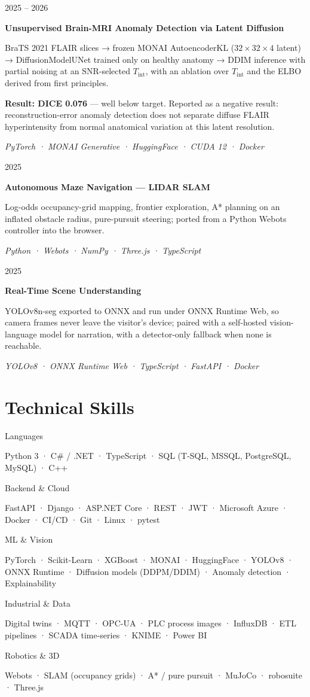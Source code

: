 \documentclass[10pt,a4paper]{article}
\newlength{\cvleft}\setlength{\cvleft}{30mm}
\newlength{\cvgap}\setlength{\cvgap}{5mm}
\newcommand{\cvrow}[2]{%
  \noindent\begin{minipage}[t]{\cvleft}\raggedright\strut #1\end{minipage}%
  \hspace{\cvgap}%
  \begin{minipage}[t]{\dimexpr\textwidth-\cvleft-\cvgap\relax}\strut #2\end{minipage}%
  \par\vspace{4.5pt}}
\newcommand{\dates}[1]{\sansfont\fontsize{9}{11}\selectfont\color{mid}#1}
\newcommand{\role}[1]{\textbf{#1}}
\newcommand{\stack}[1]{{\fontsize{9}{11}\selectfont\color{mid}\textit{#1}}}
\begin{document}
\cvrow{\dates{2025 – 2026}}{%
\role{Unsupervised Brain-MRI Anomaly Detection via Latent Diffusion}\\
\begin{pts}
\item BraTS 2021 FLAIR slices → frozen MONAI AutoencoderKL ($32\times32\times4$ latent) → DiffusionModelUNet trained only on healthy anatomy → DDIM inference with partial noising at an SNR-selected $T_{\mathrm{int}}$, with an ablation over $T_{\mathrm{int}}$ and the ELBO derived from first principles.
\item \textbf{Result: DICE 0.076} — well below target. Reported as a negative result: reconstruction-error anomaly detection does not separate diffuse FLAIR hyperintensity from normal anatomical variation at this latent resolution.
\end{pts}
\stack{PyTorch · MONAI Generative · HuggingFace · CUDA 12 · Docker}}


\cvrow{\dates{2025}}{%
\role{Autonomous Maze Navigation — LIDAR SLAM}\\
\begin{pts}
\item Log-odds occupancy-grid mapping, frontier exploration, A* planning on an inflated obstacle radius, pure-pursuit steering; ported from a Python Webots controller into the browser.
\end{pts}
\stack{Python · Webots · NumPy · Three.js · TypeScript}}


\cvrow{\dates{2025}}{%
\role{Real-Time Scene Understanding}\\
\begin{pts}
\item YOLOv8n-seg exported to ONNX and run under ONNX Runtime Web, so camera frames never leave the visitor's device; paired with a self-hosted vision-language model for narration, with a detector-only fallback when none is reachable.
\end{pts}
\stack{YOLOv8 · ONNX Runtime Web · TypeScript · FastAPI · Docker}}


\section{Technical Skills}
\cvrow{\dates{Languages}}{%
Python 3 · C\# / .NET · TypeScript · SQL (T-SQL, MSSQL, PostgreSQL, MySQL) · C++ }
\cvrow{\dates{Backend \& Cloud}}{%
FastAPI · Django · ASP.NET Core · REST · JWT · Microsoft Azure · Docker · CI/CD · Git · Linux · pytest }
\cvrow{\dates{ML \& Vision}}{%
PyTorch · Scikit-Learn · XGBoost · MONAI · HuggingFace · YOLOv8 · ONNX Runtime · Diffusion models (DDPM/DDIM) · Anomaly detection · Explainability }
\cvrow{\dates{Industrial \& Data}}{%
Digital twins · MQTT · OPC-UA · PLC process images · InfluxDB · ETL pipelines · SCADA time-series · KNIME · Power BI }
\cvrow{\dates{Robotics \& 3D}}{%
Webots · SLAM (occupancy grids) · A* / pure pursuit · MuJoCo · robosuite · Three.js }
\end{document}
